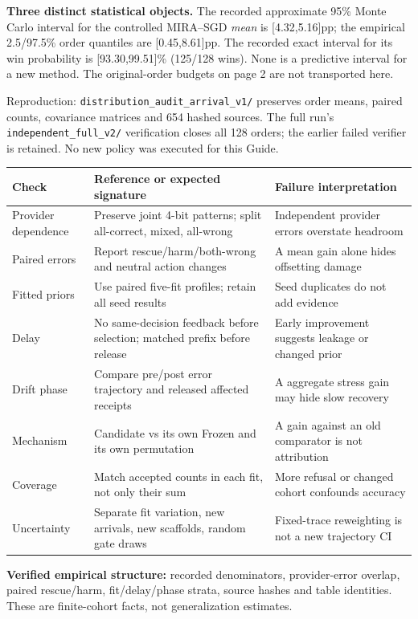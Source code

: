 \documentclass[10pt,letterpaper]{article}
\newcommand{\note}[1]{{\fontsize{8.5}{10.5}\selectfont #1\par}}
\newcommand{\sect}[1]{\vspace{5pt}{\large\bfseries #1}\par\vspace{2pt}}
\newenvironment{clean}{\begin{center}\fontsize{9.5}{11.5}\selectfont\setlength{\tabcolsep}{6pt}\renewcommand{\arraystretch}{1.06}}{\end{center}}
\begin{document}
\textbf{Three distinct statistical objects.} The recorded approximate 95\% Monte Carlo interval for the
controlled MIRA--SGD \emph{mean} is [4.32,5.16]pp; the empirical 2.5/97.5\% order quantiles are [0.45,8.61]pp.
The recorded exact interval for its win probability is [93.30,99.51]\% (125/128 wins).
None is a predictive interval for a new method. The original-order budgets on page 2 are not transported here.
\note{Reproduction: \texttt{distribution\_audit\_arrival\_v1/} preserves order means, paired counts,
covariance matrices and 654 hashed sources. The full run's \texttt{independent\_full\_v2/} verification
closes all 128 orders; the earlier failed verifier is retained. No new policy was executed for this Guide.}

\newpage
\sect{Distribution checks for the scientist}
\begin{clean}\begin{tabular}{@{}p{.20\linewidth}p{.39\linewidth}p{.32\linewidth}@{}}
\toprule
Check & Reference or expected signature & Failure interpretation \\
\midrule
Provider dependence & Preserve joint 4-bit patterns; split all-correct, mixed, all-wrong & Independent provider errors overstate headroom \\
Paired errors & Report rescue/harm/both-wrong and neutral action changes & A mean gain alone hides offsetting damage \\
Fitted priors & Use paired five-fit profiles; retain all seed results & Seed duplicates do not add evidence \\
Delay & No same-decision feedback before selection; matched prefix before release & Early improvement suggests leakage or changed prior \\
Drift phase & Compare pre/post error trajectory and released affected receipts & A aggregate stress gain may hide slow recovery \\
Mechanism & Candidate vs its own Frozen and its own permutation & A gain against an old comparator is not attribution \\
Coverage & Match accepted counts in each fit, not only their sum & More refusal or changed cohort confounds accuracy \\
Uncertainty & Separate fit variation, new arrivals, new scaffolds, random gate draws & Fixed-trace reweighting is not a new trajectory CI \\
\bottomrule
\end{tabular}\end{clean}
\sect{What has high-confidence support, and what still needs evidence}
\textbf{Verified empirical structure:} recorded denominators, provider-error overlap, paired rescue/harm,
fit/delay/phase strata, source hashes and table identities. These are finite-cohort facts, not generalization estimates.
\end{document}
